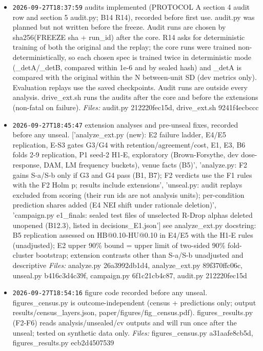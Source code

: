 \documentclass[11pt]{article}
\begin{document}
\begin{itemize}
\item \texttt{2026-09-27T18:37:59} audits implemented (PROTOCOL A section 4 audit row and section 5 audit.py; B14 R14), recorded before first use. audit.py was planned but not written before the freeze. Audit runs are chosen by sha256(FREEZE sha + run\_id) after the core. R14 asks for deterministic training of both the original and the replay; the core runs were trained non-deterministically, so each chosen spec is trained twice in deterministic mode (\_detA/\_detB, compared within 1e-6 and by sealed hash) and \_detA is compared with the original within the N between-unit SD (dev metrics only). Evaluation replays use the saved checkpoints. Audit runs are outside every analysis. drive\_ext.sh runs the audits after the core and before the extensions (non-fatal on failure). \emph{Files:} audit.py 212220fec15d, drive\_ext.sh 9241f4ecbccc
\item \texttt{2026-09-27T18:45:47} extension analyses and pre-unseal fixes, recorded before any unseal. ['analyze\_ext.py (new): E2 failure ladder, E4/E5 replication, E-S3 gates G3/G4 with retention/agreement/cost, E1, E3, B6 folds 2-9 replication, P1 seed-2 H1-E, exploratory (Brown-Forsythe, dev dose-response, DAM, LM frequency buckets), venue facts (B5)', 'analyze.py: F2 gains S-a/S-b only if G3 and G4 pass (B1, B7); F2 verdicts use the F1 rules with the F2 Holm p; results include extensions', 'unseal.py: audit replays excluded from scoring (their run ids are not analysis units); per-condition prediction shares added (E4 NEI shift under rationale deletion)', 'campaign.py e1\_finals: sealed test files of unselected R-Drop alphas deleted unopened (B12.3), listed in decisions\_E1.json'] see analyze\_ext.py docstring: B5 replication assessed on HB@0.10-HU@0.10 in E4/E5 with the H1-E rules (unadjusted); E2 upper 90\% bound = upper limit of two-sided 90\% fold-cluster bootstrap; extension contrasts other than S-a/S-b unadjusted and descriptive \emph{Files:} analyze.py 26a3992db1d4, analyze\_ext.py 89f370ffc06c, unseal.py b416c3d4c39f, campaign.py 6f1c21cb4c87, audit.py 212220fec15d
\item \texttt{2026-09-27T18:54:16} figure code recorded before any unseal. figures\_census.py is outcome-independent (census + predictions only; output results/census\_layers.json, paper/figures/fig\_census.pdf). figures\_results.py (F2-F6) reads analysis/unsealed/cv outputs and will run once after the unseal; tested on synthetic data only. \emph{Files:} figures\_census.py a31aafe8cb5d, figures\_results.py ecb2d4507539

\end{itemize}
\end{document}
